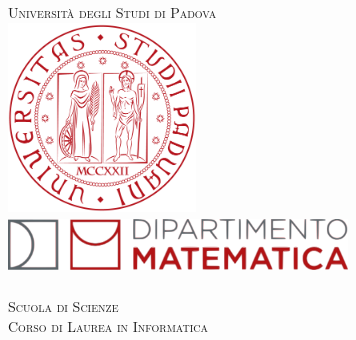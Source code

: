\begin{titlepage}
	
	\newcommand{\HRule}{\rule{\linewidth}{0.5mm}} 
	
	\center
	
	
	\textsc{\LARGE Università degli Studi di Padova}\\[1cm] 
	
	
	\includegraphics[height=5cm]{img/UniPd.png}\\[1cm]
	
	\includegraphics[height=1.5cm, width = 9cm]{img/MathDip.png}\\
	\textsc{\dipartimento}\\[1.2cm]
	\textsc{\Large Scuola di Scienze}\\[0.5cm] 
	
	\textsc{\large Corso di Laurea in Informatica}\\[0.5cm] 
	
	\vspace{2.5cm}
	
	

\end{titlepage}
